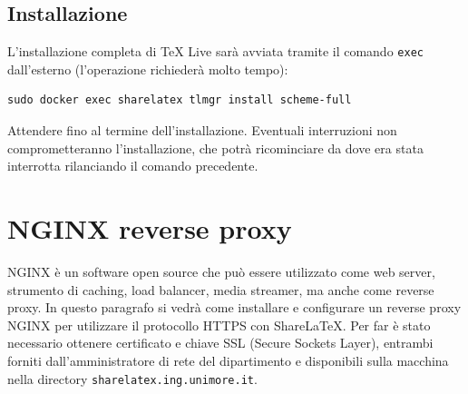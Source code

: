 \subsection{Installazione}
L'installazione completa di TeX Live sarà avviata tramite il comando \verb|exec| dall'esterno (l'operazione richiederà molto tempo):
\begin{lstlisting}
sudo docker exec sharelatex tlmgr install scheme-full
\end{lstlisting}
Attendere fino al termine dell'installazione. Eventuali interruzioni non comprometteranno l'installazione, che potrà ricominciare da dove era stata interrotta rilanciando il comando precedente.

\section{NGINX reverse proxy}
NGINX \cite{nginx} è un software open source che può essere utilizzato come web server, strumento di caching, load balancer, media streamer, ma anche come reverse proxy. In questo paragrafo si vedrà come installare e configurare un reverse proxy NGINX per utilizzare il protocollo HTTPS con ShareLaTeX. Per far è stato necessario ottenere certificato e chiave SSL (Secure Sockets Layer), entrambi forniti dall'amministratore di rete del dipartimento e disponibili sulla macchina nella directory \verb|sharelatex.ing.unimore.it|.


